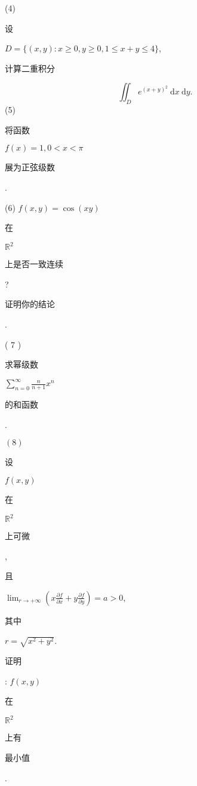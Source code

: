 \documentclass[10pt]{article}
\begin{document}
(4) \begin{CJK}{UTF8}{mj}设\end{CJK} $D=\{(x, y): x \geqslant 0, y \geqslant 0,1 \leqslant x+y \leqslant 4\}$, \begin{CJK}{UTF8}{mj}计算二重积分\end{CJK}
$$
\iint_{D} e^{(x+y)^{2}} \mathrm{~d} x \mathrm{~d} y .
$$
(5) \begin{CJK}{UTF8}{mj}将函数\end{CJK} $f(x)=1,0<x<\pi$ \begin{CJK}{UTF8}{mj}展为正弦级数\end{CJK}.

(6) $f(x, y)=\cos (x y)$ \begin{CJK}{UTF8}{mj}在\end{CJK} $\mathbb{R}^{2}$ \begin{CJK}{UTF8}{mj}上是否一致连续\end{CJK}? \begin{CJK}{UTF8}{mj}证明你的结论\end{CJK}.

( 7 ) \begin{CJK}{UTF8}{mj}求幂级数\end{CJK} $\sum_{n=0}^{\infty} \frac{n}{n+1} x^{n}$ \begin{CJK}{UTF8}{mj}的和函数\end{CJK}.

$(8)$ \begin{CJK}{UTF8}{mj}设\end{CJK} $f(x, y)$ \begin{CJK}{UTF8}{mj}在\end{CJK} $\mathbb{R}^{2}$ \begin{CJK}{UTF8}{mj}上可微\end{CJK}, \begin{CJK}{UTF8}{mj}且\end{CJK} $\lim _{r \rightarrow+\infty}\left(x \frac{\partial f}{\partial x}+y \frac{\partial f}{\partial y}\right)=a>0$, \begin{CJK}{UTF8}{mj}其中\end{CJK} $r=\sqrt{x^{2}+y^{2}}$. \begin{CJK}{UTF8}{mj}证明\end{CJK}: $f(x, y)$ \begin{CJK}{UTF8}{mj}在\end{CJK} $\mathbb{R}^{2}$ \begin{CJK}{UTF8}{mj}上有\end{CJK} \begin{CJK}{UTF8}{mj}最小值\end{CJK}.
\end{document}
